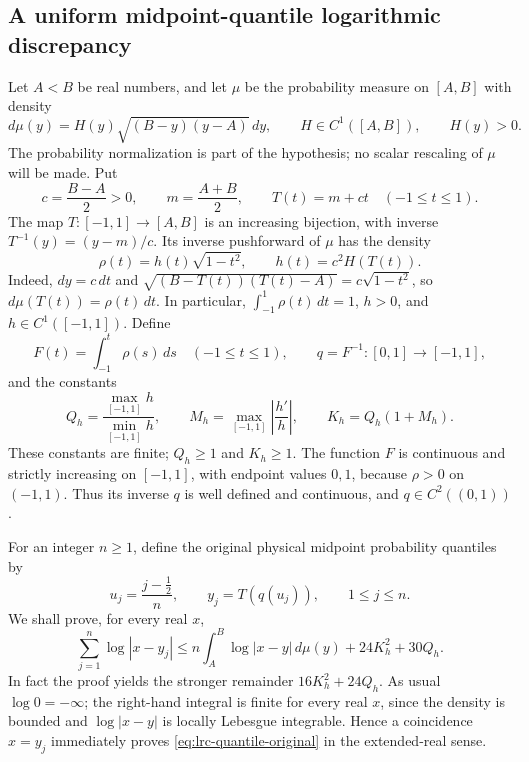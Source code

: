 
\subsection{A uniform midpoint-quantile logarithmic discrepancy}

Let $A<B$ be real numbers, and let $\mu$ be the probability measure on
$[A,B]$ with density
\[
 d\mu(y)=H(y)\sqrt{(B-y)(y-A)}\,dy,
 \qquad H\in C^1([A,B]),\qquad H(y)>0.
\]
The probability normalization is part of the hypothesis; no scalar
rescaling of $\mu$ will be made. Put
\[
 c=\frac{B-A}{2}>0,\qquad m=\frac{A+B}{2},\qquad
 T(t)=m+ct\quad(-1\leq t\leq1).
\]
The map $T:[-1,1]\longrightarrow[A,B]$ is an increasing bijection,
with inverse $T^{-1}(y)=(y-m)/c$. Its inverse pushforward of $\mu$ has
the density
\[
 \rho(t)=h(t)\sqrt{1-t^2},\qquad h(t)=c^2H(T(t)).
\]
Indeed, $dy=c\,dt$ and
$\sqrt{(B-T(t))(T(t)-A)}=c\sqrt{1-t^2}$, so
$d\mu(T(t))=\rho(t)\,dt$. In particular,
$\int_{-1}^1\rho(t)\,dt=1$, $h>0$, and $h\in C^1([-1,1])$.
Define
\[
 F(t)=\int_{-1}^t\rho(s)\,ds\quad(-1\leq t\leq1),\qquad
 q=F^{-1}:[0,1]\longrightarrow[-1,1],
\]
and the constants
\[
 Q_h=\frac{\max_{[-1,1]}h}{\min_{[-1,1]}h},\qquad
 M_h=\max_{[-1,1]}\left|\frac{h'}h\right|,\qquad
 K_h=Q_h(1+M_h).
\]
These constants are finite; $Q_h\geq1$ and $K_h\geq1$. The function
$F$ is continuous and strictly increasing on $[-1,1]$, with endpoint
values $0,1$, because $\rho>0$ on $(-1,1)$. Thus its inverse $q$ is
well defined and continuous, and $q\in C^2((0,1))$.

For an integer $n\geq1$, define the original physical midpoint
probability quantiles by
\[
 u_j=\frac{j-\tfrac12}{n},\qquad y_j=T(q(u_j)),
 \qquad 1\leq j\leq n.
\]
We shall prove, for every real $x$,
\begin{equation}\label{eq:lrc-quantile-original}
 \sum_{j=1}^n\log|x-y_j|
 \leq n\int_A^B\log|x-y|\,d\mu(y)
       +24K_h^2+30Q_h.
\end{equation}
In fact the proof yields the stronger remainder $16K_h^2+24Q_h$.
As usual $\log0=-\infty$; the right-hand integral is finite for every
real $x$, since the density is bounded and $\log|x-y|$ is locally
Lebesgue integrable. Hence a coincidence $x=y_j$ immediately proves
\eqref{eq:lrc-quantile-original} in the extended-real sense.

